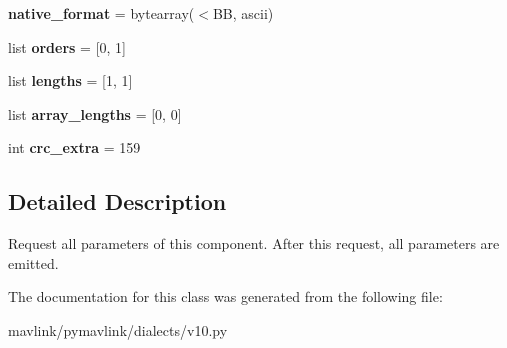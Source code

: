 \begin{DoxyCompactItemize}
{\bfseries native\+\_\+format} = bytearray(\textquotesingle{}$<$BB\textquotesingle{}, \textquotesingle{}ascii\textquotesingle{})
\item 
\mbox{\label{classpymavlink_1_1dialects_1_1v10_1_1MAVLink__param__request__list__message_a2059d22aabdff5df8cc3c1a964c4cd22}} 
list {\bfseries orders} = \mbox{[}0, 1\mbox{]}
\item 
\mbox{\label{classpymavlink_1_1dialects_1_1v10_1_1MAVLink__param__request__list__message_a783b43c5e828e3a59db03cae763f0948}} 
list {\bfseries lengths} = \mbox{[}1, 1\mbox{]}
\item 
\mbox{\label{classpymavlink_1_1dialects_1_1v10_1_1MAVLink__param__request__list__message_ad21dc29c97a19d6a3591cae8df13aa6b}} 
list {\bfseries array\+\_\+lengths} = \mbox{[}0, 0\mbox{]}
\item 
\mbox{\label{classpymavlink_1_1dialects_1_1v10_1_1MAVLink__param__request__list__message_a2bc6fc3ccbdc67c9772e86a293fd57bd}} 
int {\bfseries crc\+\_\+extra} = 159
\end{DoxyCompactItemize}


\subsection{Detailed Description}
\begin{DoxyVerb}Request all parameters of this component. After this request,
all parameters are emitted.
\end{DoxyVerb}
 

The documentation for this class was generated from the following file\+:\begin{DoxyCompactItemize}
\item 
mavlink/pymavlink/dialects/v10.\+py\end{DoxyCompactItemize}

